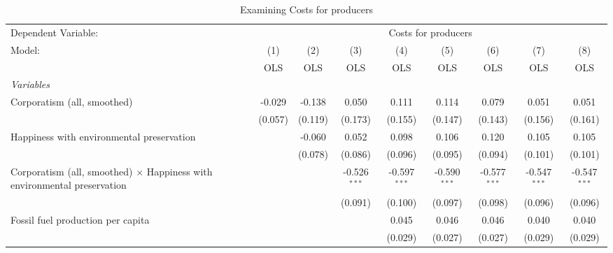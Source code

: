 
\begin{table}[htbp]
   \caption{Examining Costs for producers}
   \centering
   \begin{tabular}{lcccccccc}
      \toprule
      Dependent Variable: & \multicolumn{8}{c}{Costs for producers}\\
      Model:                                                                          & (1)     & (2)     & (3)            & (4)            & (5)            & (6)            & (7)            & (8)\\  
                                                                                      &  OLS    & OLS     & OLS            & OLS            & OLS            & OLS            & OLS            & OLS\\  
      \midrule
      \emph{Variables}\\
      Corporatism (all, smoothed)                                                     & -0.029  & -0.138  & 0.050          & 0.111          & 0.114          & 0.079          & 0.051          & 0.051\\   
                                                                                      & (0.057) & (0.119) & (0.173)        & (0.155)        & (0.147)        & (0.143)        & (0.156)        & (0.161)\\   
      Happiness with environmental preservation                                       &         & -0.060  & 0.052          & 0.098          & 0.106          & 0.120          & 0.105          & 0.105\\   
                                                                                      &         & (0.078) & (0.086)        & (0.096)        & (0.095)        & (0.094)        & (0.101)        & (0.101)\\   
      Corporatism (all, smoothed) $\times$ Happiness with environmental preservation  &         &         & -0.526$^{***}$ & -0.597$^{***}$ & -0.590$^{***}$ & -0.577$^{***}$ & -0.547$^{***}$ & -0.547$^{***}$\\   
                                                                                      &         &         & (0.091)        & (0.100)        & (0.097)        & (0.098)        & (0.096)        & (0.096)\\   
      Fossil fuel production per capita                                               &         &         &                & 0.045          & 0.046          & 0.046          & 0.040          & 0.040\\   
                                                                                      &         &         &                & (0.029)        & (0.027)        & (0.027)        & (0.029)        & (0.029)\\   

\end{tabular}
\end{table}
